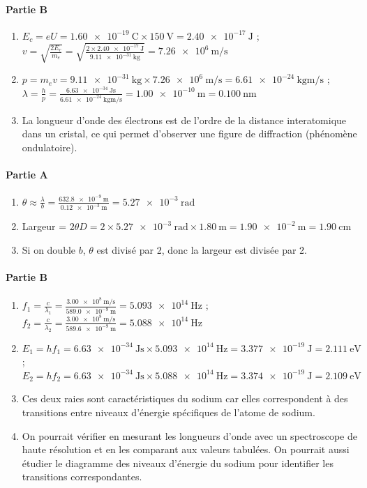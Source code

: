 \paragraph{Partie B}
\begin{enumerate}
  \item \(E_c = e U = \SI{1.60e-19}{\coulomb} \times \SI{150}{\volt} = \SI{2.40e-17}{\joule}\) ; \(v = \sqrt{\frac{2 E_c}{m_e}} = \sqrt{\frac{2 \times \SI{2.40e-17}{\joule}}{\SI{9.11e-31}{\kilogram}}} = \SI{7.26e6}{\metre\per\second}\)
  \item \(p = m_e v = \SI{9.11e-31}{\kilogram} \times \SI{7.26e6}{\metre\per\second} = \SI{6.61e-24}{\kilogram\metre\per\second}\) ; \(\lambda = \frac{h}{p} = \frac{\SI{6.63e-34}{\joule\second}}{\SI{6.61e-24}{\kilogram\metre\per\second}} = \SI{1.00e-10}{\metre} = \SI{0.100}{\nano\metre}\)
  \item La longueur d'onde des électrons est de l'ordre de la distance interatomique dans un cristal, ce qui permet d'observer une figure de diffraction (phénomène ondulatoire).
\end{enumerate}

\paragraph{Partie A}
\begin{enumerate}
  \item \(\theta \approx \frac{\lambda}{b} = \frac{\SI{632.8e-9}{\metre}}{\SI{0.12e-3}{\metre}} = \SI{5.27e-3}{\radian}\)
  \item Largeur = \(2 \theta D = 2 \times \SI{5.27e-3}{\radian} \times \SI{1.80}{\metre} = \SI{1.90e-2}{\metre} = \SI{1.90}{\centi\metre}\)
  \item Si on double \(b\), \(\theta\) est divisé par 2, donc la largeur est divisée par 2.
\end{enumerate}

\paragraph{Partie B}
\begin{enumerate}
  \item \(f_1 = \frac{c}{\lambda_1} = \frac{\SI{3.00e8}{\metre\per\second}}{\SI{589.0e-9}{\metre}} = \SI{5.093e14}{\hertz}\) ; \(f_2 = \frac{c}{\lambda_2} = \frac{\SI{3.00e8}{\metre\per\second}}{\SI{589.6e-9}{\metre}} = \SI{5.088e14}{\hertz}\)
  \item \(E_1 = h f_1 = \SI{6.63e-34}{\joule\second} \times \SI{5.093e14}{\hertz} = \SI{3.377e-19}{\joule} = \SI{2.111}{\electronvolt}\) ; \(E_2 = h f_2 = \SI{6.63e-34}{\joule\second} \times \SI{5.088e14}{\hertz} = \SI{3.374e-19}{\joule} = \SI{2.109}{\electronvolt}\)
  \item Ces deux raies sont caractéristiques du sodium car elles correspondent à des transitions entre niveaux d'énergie spécifiques de l'atome de sodium.
  \item On pourrait vérifier en mesurant les longueurs d'onde avec un spectroscope de haute résolution et en les comparant aux valeurs tabulées. On pourrait aussi étudier le diagramme des niveaux d'énergie du sodium pour identifier les transitions correspondantes.
\end{enumerate}
